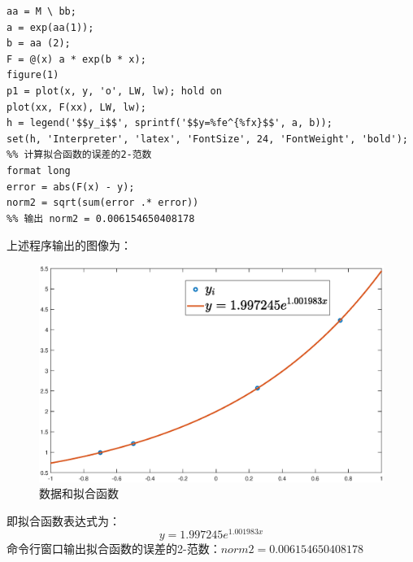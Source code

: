 \documentclass[12pt,a4paper,utf8]{ctexart}
\begin{document}
\begin{enumerate}
\begin{lstlisting}[frame=single]
aa = M \ bb;
a = exp(aa(1));
b = aa (2);
F = @(x) a * exp(b * x);
figure(1)
p1 = plot(x, y, 'o', LW, lw); hold on
plot(xx, F(xx), LW, lw);
h = legend('$$y_i$$', sprintf('$$y=%fe^{%fx}$$', a, b));
set(h, 'Interpreter', 'latex', 'FontSize', 24, 'FontWeight', 'bold');
%% 计算拟合函数的误差的2-范数
format long
error = abs(F(x) - y);
norm2 = sqrt(sum(error .* error))
%% 输出 norm2 = 0.006154650408178
\end{lstlisting}
上述程序输出的图像为：
\begin{figure}[H]
	\centering
	\includegraphics[width=1\textwidth]{p3.eps}
	\caption{数据和拟合函数}
\end{figure}
即拟合函数表达式为：
\begin{equation}
   y=1.997245e^{1.001983x} \nonumber
\end{equation}
命令行窗口输出拟合函数的误差的2-范数：$norm2 = 0.006154650408178$
\end{enumerate}
\end{document}
